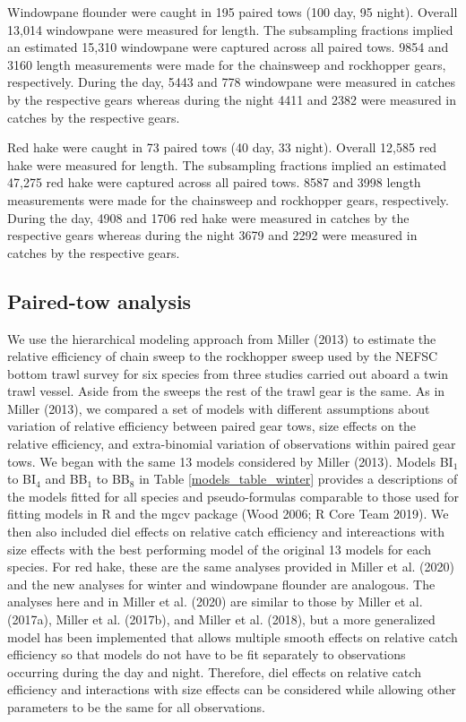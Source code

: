 \documentclass[]{article}
\begin{document}
Windowpane flounder were caught in 195 paired tows (100 day, 95 night).
Overall 13,014 windowpane were measured for length. The subsampling
fractions implied an estimated 15,310 windowpane were captured across
all paired tows. 9854 and 3160 length measurements were made for the
chainsweep and rockhopper gears, respectively. During the day, 5443 and
778 windowpane were measured in catches by the respective gears whereas
during the night 4411 and 2382 were measured in catches by the
respective gears.

Red hake were caught in 73 paired tows (40 day, 33 night). Overall
12,585 red hake were measured for length. The subsampling fractions
implied an estimated 47,275 red hake were captured across all paired
tows. 8587 and 3998 length measurements were made for the chainsweep and
rockhopper gears, respectively. During the day, 4908 and 1706 red hake
were measured in catches by the respective gears whereas during the
night 3679 and 2292 were measured in catches by the respective gears.

\hypertarget{paired-tow-analysis}{%
\subsection{Paired-tow analysis}\label{paired-tow-analysis}}

We use the hierarchical modeling approach from Miller (2013) to estimate
the relative efficiency of chain sweep to the rockhopper sweep used by
the NEFSC bottom trawl survey for six species from three studies carried
out aboard a twin trawl vessel. Aside from the sweeps the rest of the
trawl gear is the same. As in Miller (2013), we compared a set of models
with different assumptions about variation of relative efficiency
between paired gear tows, size effects on the relative efficiency, and
extra-binomial variation of observations within paired gear tows. We
began with the same 13 models considered by Miller (2013). Models
BI\(_1\) to BI\(_4\) and BB\(_1\) to BB\(_8\) in Table
\ref{models_table_winter} provides a descriptions of the models fitted
for all species and pseudo-formulas comparable to those used for fitting
models in R and the mgcv package (Wood 2006; R Core Team 2019). We then
also included diel effects on relative catch efficiency and
intereactions with size effects with the best performing model of the
original 13 models for each species. For red hake, these are the same
analyses provided in Miller et al. (2020) and the new analyses for
winter and windowpane flounder are analogous. The analyses here and in
Miller et al. (2020) are similar to those by Miller et al. (2017a),
Miller et al. (2017b), and Miller et al. (2018), but a more generalized
model has been implemented that allows multiple smooth effects on
relative catch efficiency so that models do not have to be fit
separately to observations occurring during the day and night.
Therefore, diel effects on relative catch efficiency and interactions
with size effects can be considered while allowing other parameters to
be the same for all observations.
\end{document}
